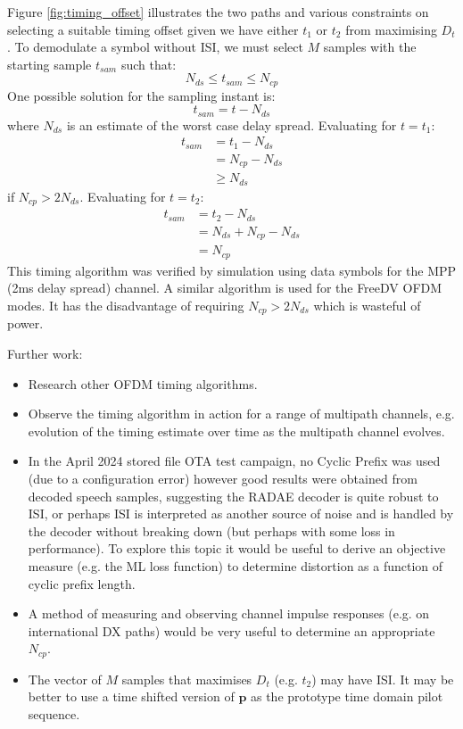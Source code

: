 \documentclass{article}
\begin{document}
Figure \ref{fig:timing_offset} illustrates the two paths and various constraints on selecting a suitable timing offset given we have either $t_1$ or $t_2$ from maximising $D_t$. To demodulate a symbol without ISI, we must select $M$ samples with the starting sample $t_{sam}$ such that:
\begin{equation}
N_{ds} \le t_{sam} \le N_{cp}
\end{equation}
One possible solution for the sampling instant is:
\begin{equation}
t_{sam} = t - N_{ds}
\end{equation}
where $N_{ds}$ is an estimate of the worst case delay spread.  Evaluating for $t=t_1$:
\begin{equation} 
\begin{split}
t_{sam} &= t_1 - N_{ds} \\
        &= N_{cp} - N_{ds} \\
        &\ge N_{ds}\
\end{split}
\end{equation}
if $N_{cp} > 2N_{ds}$. Evaluating for $t=t_2$:
\begin{equation} 
\begin{split}
 t_{sam} &= t_2 - N_{ds} \\
         &= N_{ds} + N_{cp} - N_{ds} \\
         &= N_{cp}
\end{split}
\end{equation}
This timing algorithm was verified by simulation using data symbols for the MPP (2ms delay spread) channel.  A similar algorithm is used for the FreeDV OFDM modes. It has the disadvantage of requiring $N_{cp}>2N_{ds}$ which is wasteful of power. 

Further work:
\begin{itemize}
\item Research other OFDM timing algorithms.
\item Observe the timing algorithm in action for a range of multipath channels, e.g. evolution of the timing estimate over time as the multipath channel evolves.
\item In the April 2024 stored file OTA test campaign, no Cyclic Prefix was used (due to a configuration error) however good results were obtained from decoded speech samples, suggesting the RADAE decoder is quite robust to ISI, or perhaps ISI is interpreted as another source of noise and is handled by the decoder without breaking down (but perhaps with some loss in performance). To explore this topic it would be useful to derive an objective measure (e.g. the ML loss function) to determine distortion as a function of cyclic prefix length.
\item A method of measuring and observing channel impulse responses (e.g. on international DX paths) would be very useful to determine an appropriate $N_{cp}$.
\item The vector of $M$ samples that maximises $D_t$ (e.g. $t_2$) may have ISI.  It may be better to use a time shifted version of $\bm{p}$ as the prototype time domain pilot sequence.
\end{itemize} 
\end{document}

